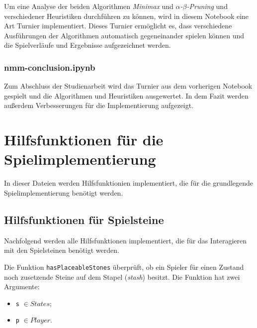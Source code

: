 \documentclass[11pt]{article}
\providecommand{\tightlist}{%
      \setlength{\itemsep}{0pt}\setlength{\parskip}{0pt}}
\begin{document}
Um eine Analyse der beiden Algorithmen \emph{Minimax} und
\emph{$\alpha$-$\beta$-Pruning} und verschiedener Heuristiken durchführen zu können,
wird in diesem Notebook eine Art Turnier implementiert. Dieses Turnier
ermöglicht es, dass verschiedene Ausführungen der Algorithmen
automatisch gegeneinander spielen können und die Spielverläufe und
Ergebnisse aufgezeichnet werden.

\hypertarget{nmm-conclusion.ipynb}{%
\subsubsection{nmm-conclusion.ipynb}\label{nmm-conclusion.ipynb}}

Zum Abschluss der Studienarbeit wird das Turnier aus dem vorherigen
Notebook gespielt und die Algorithmen und Heuristiken ausgewertet. In
dem Fazit werden außerdem Verbesserungen für die Implementierung
aufgezeigt.










\hypertarget{hilfsfunktionen-fuxfcr-die-spielimplementierung}{%
\section{Hilfsfunktionen für die
Spielimplementierung}\label{hilfsfunktionen-fuxfcr-die-spielimplementierung}}

In dieser Dateien werden Hilfsfunktionien implementiert, die für die
grundlegende Spielimplementierung benötigt werden.

    \hypertarget{hilfsfunktionen-fuxfcr-spielsteine}{%
\subsection{Hilfsfunktionen für
Spielsteine}\label{hilfsfunktionen-fuxfcr-spielsteine}}

Nachfolgend werden alle Hilfsfunktionen implementiert, die für das
Interagieren mit den Spielsteinen benötigt werden.

    Die Funktion \texttt{hasPlaceableStones} überprüft, ob ein Spieler für
einen Zustand noch zusetzende Steine auf dem Stapel (\emph{stash})
besitzt. Die Funktion hat zwei Argumente:

\begin{itemize}
\tightlist
\item
  \texttt{s} \(\in States\);
\item
  \texttt{p} \(\in Player\).
\end{itemize}
\end{document}
